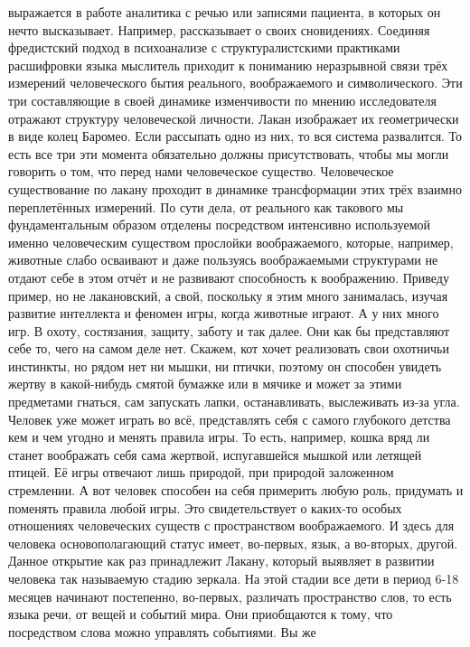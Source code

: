 выражается в работе аналитика с речью или записями пациента, в которых он нечто
высказывает. Например, рассказывает о своих сновидениях. Соединяя фредистский
подход в психоанализе с структуралистскими практиками расшифровки языка
мыслитель приходит к пониманию неразрывной связи трёх измерений человеческого
бытия реального, воображаемого и символического. Эти три составляющие в своей
динамике изменчивости по мнению исследователя отражают структуру человеческой
личности. Лакан изображает их геометрически в виде колец Баромео. Если рассыпать
одно из них, то вся система развалится. То есть все три эти момента обязательно
должны присутствовать, чтобы мы могли говорить о том, что перед нами
человеческое существо. Человеческое существование по лакану проходит в динамике
трансформации этих трёх взаимно переплетённых измерений. По сути дела, от
реального как такового мы фундаментальным образом отделены посредством
интенсивно используемой именно человеческим существом прослойки воображаемого,
которые, например, животные слабо осваивают и даже пользуясь воображаемыми
структурами не отдают себе в этом отчёт и не развивают способность к
воображению. Приведу пример, но не лакановский, а свой, поскольку я этим много
занималась, изучая развитие интеллекта и феномен игры, когда животные играют. А
у них много игр. В охоту, состязания, защиту, заботу и так далее. Они как бы
представляют себе то, чего на самом деле нет. Скажем, кот хочет реализовать свои
охотничьи инстинкты, но рядом нет ни мышки, ни птички, поэтому он способен
увидеть жертву в какой-нибудь смятой бумажке или в мячике и может за этими
предметами гнаться, сам запускать лапки, останавливать, выслеживать из-за угла.
Человек уже может играть во всё, представлять себя с самого глубокого детства
кем и чем угодно и менять правила игры. То есть, например, кошка вряд ли станет
воображать себя сама жертвой, испугавшейся мышкой или летящей птицей. Её игры
отвечают лишь природой, при природой заложенном стремлении. А вот человек
способен на себя примерить любую роль, придумать и поменять правила любой игры.
Это свидетельствует о каких-то особых отношениях человеческих существ с
пространством воображаемого. И здесь для человека основополагающий статус имеет,
во-первых, язык, а во-вторых, другой. Данное открытие как раз принадлежит
Лакану, который выявляет в развитии человека так называемую стадию зеркала. На
этой стадии все дети в период 6-18 месяцев начинают постепенно, во-первых,
различать пространство слов, то есть языка речи, от вещей и событий мира. Они
приобщаются к тому, что посредством слова можно управлять событиями. Вы же
